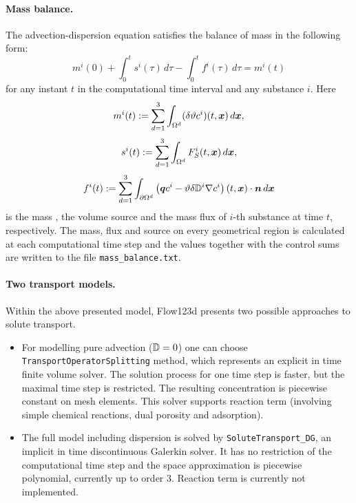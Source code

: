 \paragraph{Mass balance.}
The advection-dispersion equation satisfies the balance of mass in the following form:
$$ m^i(0) + \int_0^t s^i(\tau) \,d\tau - \int_0^t f^i(\tau) \,d\tau = m^i(t) $$
for any instant $t$ in the computational time interval and any substance $i$.
Here
$$ m^i(t) := \sum_{d=1}^3\int_{\Omega^d}(\delta\vartheta c^i)(t,\mathbf{\boldsymbol{x}})\,d\mathbf{\boldsymbol{x}}, $$
$$ s^i(t) := \sum_{d=1}^3\int_{\Omega^d}F_S^i(t,\mathbf{\boldsymbol{x}})\,d\mathbf{\boldsymbol{x}}, $$
$$ f^i(t) := \sum_{d=1}^3\int_{\partial\Omega^d}\left(\mathbf{\boldsymbol{q}} c^i - \vartheta\delta{{\mathbb{D}}}^i\nabla c^i\right)(t,\mathbf{\boldsymbol{x}})\cdot\mathbf{\boldsymbol{n}} \,d\mathbf{\boldsymbol{x}} $$
is the mass , the volume source  and the mass flux  of $i$-th substance at time $t$, respectively.
The mass, flux and source on every geometrical region is calculated at each computational time step and the values together with the control sums are written to the file \texttt{mass\_balance.txt}.


\paragraph{Two transport models.}
Within the above presented model, Flow123d presents two possible approaches to solute transport.
\begin{itemize}
\item For modelling pure advection (${\mathbb{D}}=0$) one can choose {\tt TransportOperatorSplitting} method, which represents an explicit in time finite volume solver. The solution process for one time step is faster, but the maximal time step is restricted. The resulting concentration is piecewise constant on mesh elements. This solver supports reaction term (involving simple chemical reactions, dual porosity and adsorption).
\item The full model including dispersion is solved by {\tt SoluteTransport\_DG}, an implicit in time discontinuous Galerkin solver. It has no restriction of the computational time step and the space approximation is piecewise polynomial, currently up to order 3. Reaction term is currently not implemented.
\end{itemize}



